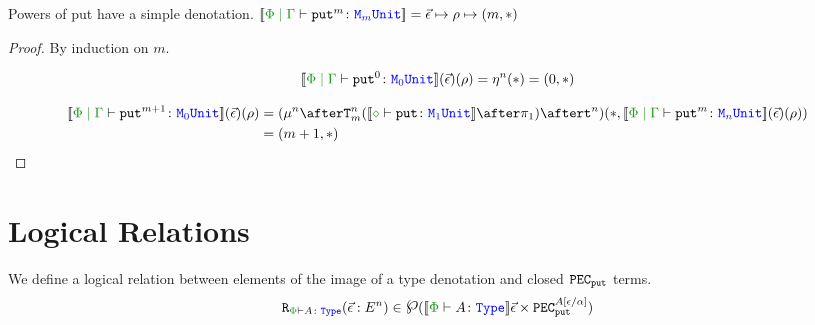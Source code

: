 \documentclass{Report}
\begin{document}
\begin{lemma}
    Powers of put have a simple denotation.
$\deno{\gpetyperelation{\put^m}{\M{m}{\U}}} = \ev\mapsto\rho\mapsto(m, \singleton)$    
\end{lemma}

\begin{proof}
    By induction on $m$.

    
    \begin{equation}
        \deno{\gpetyperelation{\put^0}{\M{0}{\U}}}\fundRho = \pointn{}(\singleton) = (0, \singleton)
    \end{equation}
    
    \begin{align*}
        \deno{\gpetyperelation{\put^{m+1}}{\M{0}{\U}}}\fundRho & = (\bindmu^n\after\Tn{m}{(\deno{\typerelation{\nil}{\put}{\M{1}{\U}}}\after\p)}\after \strengtht^n)(\singleton, \deno{\gpetyperelation{\put^m}{\M{n}{\U}}}\fundRho)\\
        & = (m+1, \singleton)
    \end{align*}
\end{proof}

\section{Logical Relations}

We define a logical relation between elements of the image of a type denotation and closed $\texttt{PEC}_{\texttt{put}}$ terms.
\begin{equation}
    \label{LogicalRelationType}
    \erelates{\P}{A}(\ev: E^n) \in \powset{\deno{\wellformedt{\P}{A}}\ev\times \pecput^{A\ssub{\a}{\e}}}
\end{equation}
\end{document}
